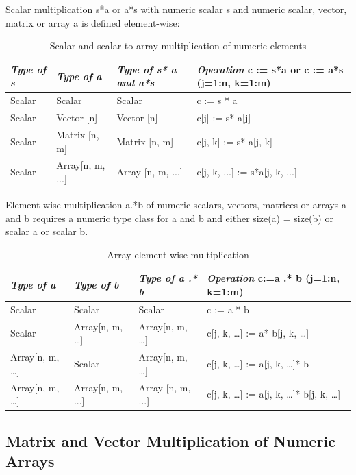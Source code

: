 \documentclass[10pt,a4paper]{report}
\def\doublelabel#1{\label{#1}\hypertarget{#1}{}}
\begin{document}
Scalar multiplication s*a or a*s with numeric scalar s and numeric
scalar, vector, matrix or array a is defined element-wise:

\begin{longtable}[]{|l|l|l|l|}
\caption{Scalar and scalar to array multiplication of numeric elements}\\
\hline
\emph{Type of s} & \emph{Type of a} & \emph{Type of s* a and a*s} &
\emph{Operation} c := s*a or c := a*s (j=1:n, k=1:m)\\ \hline
\endhead
Scalar & Scalar & Scalar & c := s * a\\ \hline
Scalar & Vector {[}n{]} & Vector {[}n{]} & c{[}j{]} := s*
a{[}j{]}\\ \hline
Scalar & Matrix {[}n, m{]} & Matrix {[}n, m{]} & c{[}j, k{]} := s*
a{[}j, k{]}\\ \hline
Scalar & Array{[}n, m, ...{]} & Array {[}n, m, ...{]} & c{[}j, k, ...{]}
:= s*a{[}j, k, ...{]}\\ \hline
\end{longtable}

Element-wise multiplication a.*b of numeric scalars, vectors, matrices
or arrays a and b requires a numeric type class for a and b and either
size(a) = size(b) or scalar a or scalar b.

\begin{longtable}[]{|l|l|l|l|}
\caption{Array element-wise multiplication}\\
\hline
\emph{Type of a} & \emph{Type of b} & \emph{Type of a .* b} &
\emph{Operation} c:=a .* b (j=1:n, k=1:m)\\ \hline
\endhead
Scalar & Scalar & Scalar & c := a * b\\ \hline
Scalar & Array{[}n, m, \ldots{}{]} & Array{[}n, m, \ldots{}{]} & c{[}j,
k, \ldots{}{]} := a* b{[}j, k, \ldots{}{]}\\ \hline
Array{[}n, m, \ldots{}{]} & Scalar & Array{[}n, m, \ldots{}{]} & c{[}j,
k, \ldots{}{]} := a{[}j, k, \ldots{}{]}* b\\ \hline
Array{[}n, m, \ldots{}{]} & Array{[}n, m, ...{]} & Array {[}n, m, ...{]}
& c{[}j, k, \ldots{}{]} := a{[}j, k, \ldots{}{]}* b{[}j, k,
\ldots{}{]}\\ \hline
\end{longtable}

\subsection{Matrix and Vector Multiplication of Numeric Arrays}\doublelabel{matrix-and-vector-multiplication-of-numeric-arrays}
\end{document}
